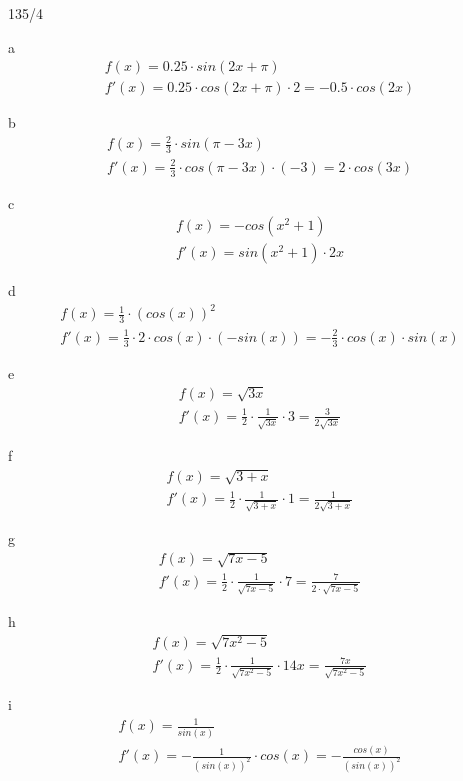 \begin{exercise}{135/4}
  \item [a]
  \begin{gather*}
    f(x) = 0.25 \cdot sin(2x + \pi) \\
    f'(x) = 0.25 \cdot cos(2x + \pi) \cdot 2 = -0.5 \cdot cos(2x)
  \end{gather*}
  \item [b]
  \begin{gather*}
    f(x) = \frac{2}{3} \cdot sin(\pi - 3x) \\
    f'(x) = \frac{2}{3} \cdot cos(\pi - 3x) \cdot (-3) = 2 \cdot cos(3x)
  \end{gather*}
  \item [c]
  \begin{gather*}
    f(x) = -cos(x^2 + 1) \\
    f'(x) = sin(x^2 + 1) \cdot 2x
  \end{gather*}
  \item [d]
  \begin{gather*}
    f(x) = \frac{1}{3} \cdot (cos(x))^2 \\
    f'(x) = \frac{1}{3} \cdot 2 \cdot cos(x) \cdot (-sin(x)) = -\frac{2}{3} \cdot cos(x) \cdot sin(x)
  \end{gather*}
  \item [e]
  \begin{gather*}
    f(x) = \sqrt{3x} \\
    f'(x) = \frac{1}{2} \cdot \frac{1}{\sqrt{3x}} \cdot 3 = \frac{3}{2\sqrt{3x}}
  \end{gather*}
  \item [f]
  \begin{gather*}
    f(x) = \sqrt{3 + x} \\
    f'(x) = \frac{1}{2} \cdot \frac{1}{\sqrt{3 + x}} \cdot 1 = \frac{1}{2\sqrt{3 + x}}
  \end{gather*}
  \item [g]
  \begin{gather*}
    f(x) = \sqrt{7x - 5} \\
    f'(x) = \frac{1}{2} \cdot \frac{1}{\sqrt{7x - 5}} \cdot 7 = \frac{7}{2 \cdot \sqrt{7x - 5}}
  \end{gather*}
  \item [h]
  \begin{gather*}
    f(x) = \sqrt{7x^2 - 5} \\
    f'(x) = \frac{1}{2} \cdot \frac{1}{\sqrt{7x^2 - 5}} \cdot 14x = \frac{7x}{\sqrt{7x^2 - 5}}
  \end{gather*}
  \item [i]
  \begin{gather*}
    f(x) = \frac{1}{sin(x)} \\
    f'(x) = -\frac{1}{(sin(x))^2} \cdot cos(x) = -\frac{cos(x)}{(sin(x))^2}
  \end{gather*}
\end{exercise}
\newpage
